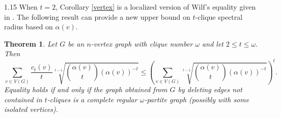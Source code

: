 \documentclass[preprint,12pt]{elsarticle1}
\newtheorem{thm}{Theorem}[section]
\numberwithin{equation}{section}
\begin{document}
\begin{spacing}{1.15}
When $t=2$, Corollary \ref{vertex} is a localized version of Wilf's equality given in \cite{liulelearxiv}.
The following result can provide a new upper bound on $t$-clique spectral radius based on $\alpha(v)$.

\begin{thm}\label{le}
Let $G$ be an $n$-vertex graph with clique number $\omega$ and let $2\le t\le\omega$. Then
$$\sum_{v\in V(G)}\frac{c_t(v)}{t}\sqrt[t-1]{\binom{\alpha(v)}{t}\left(\alpha(v)\right)^{-t}} \le \left( \sum_{v\in V(G)}\sqrt[t-1]{\binom{\alpha(v)}{t}\left(\alpha(v)\right)^{-t}} \right)^{t}.$$
Equality holds if and only if the graph obtained from $G$ by deleting edges not contained in $t$-cliques is a complete regular $\omega$-partite graph (possibly with some isolated vertices).
\end{thm}


\end{spacing}
\end{document}
